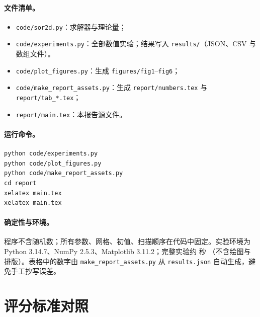 \documentclass[UTF8,fontset=windows,a4paper,11pt]{ctexart}
\begin{document}
{\small

\paragraph{文件清单。}
\begin{itemize}[leftmargin=2.1em,itemsep=0.1em,topsep=0.2em]
\item \texttt{code/sor2d.py}：求解器与理论量；
\item \texttt{code/experiments.py}：全部数值实验；结果写入 \texttt{results/}（JSON、CSV 与数组文件）。
\item \texttt{code/\allowbreak plot\_figures.py}：生成 \texttt{figures/fig1}--\texttt{fig6}；
\item \texttt{code/\allowbreak make\_report\_assets.py}：生成 \texttt{report/\allowbreak numbers.tex} 与
\texttt{report/\allowbreak tab\_*.tex}；
\item \texttt{report/main.tex}：本报告源文件。
\end{itemize}

\paragraph{运行命令。}
\begin{verbatim}
python code/experiments.py
python code/plot_figures.py
python code/make_report_assets.py
cd report
xelatex main.tex
xelatex main.tex
\end{verbatim}

\paragraph{确定性与环境。}
程序不含随机数；所有参数、网格、初值、扫描顺序在代码中固定。实验环境为
Python 3.14.7、NumPy 2.5.3、Matplotlib 3.11.2；完整实验约 \Elapsed{} 秒
（不含绘图与排版）。表格中的数字由 \texttt{make\_report\_assets.py} 从
\texttt{results.json} 自动生成，避免手工抄写误差。
}

\section{评分标准对照}
\label{app:rubric}
\end{document}
